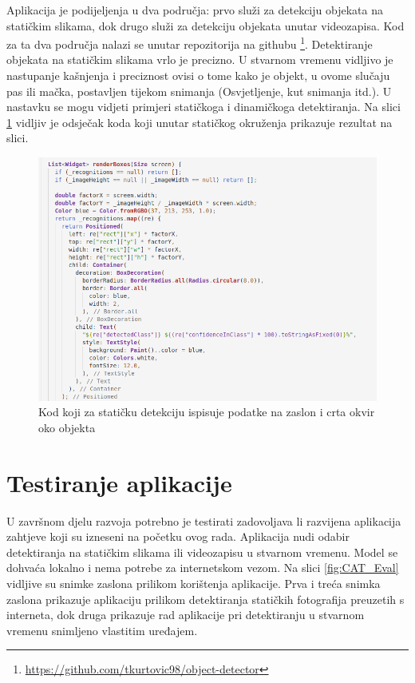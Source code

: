 Aplikacija je podijeljenja u dva područja: prvo služi za detekciju objekata na statičkim slikama, dok drugo služi za detekciju objekata unutar videozapisa. Kod za ta dva područja nalazi se unutar repozitorija na githubu \footnote{\url{https://github.com/tkurtovic98/object-detector}}.\newline
Detektiranje objekata na statičkim slikama vrlo je precizno. U stvarnom vremenu vidljivo je nastupanje kašnjenja i preciznost ovisi o tome 
kako je objekt, u ovome slučaju pas ili mačka, postavljen tijekom snimanja (Osvjetljenje, kut snimanja itd.). U nastavku se mogu vidjeti primjeri statičkoga i dinamičkoga detektiranja. Na slici \ref{Flutter-render-boxes} vidljiv je odsječak koda koji
unutar statičkog okruženja prikazuje rezultat na slici.

\begin{figure}[htb]
    \centering
    \includegraphics[width=14cm]{img/Flutter-render-boxes.png}
    \caption{Kod koji za statičku detekciju ispisuje podatke na zaslon i crta okvir oko objekta}
    \label{Flutter-render-boxes}
\end{figure}

\section{Testiranje aplikacije}
U završnom djelu razvoja potrebno je testirati zadovoljava li razvijena aplikacija zahtjeve koji su izneseni na početku ovog rada. Aplikacija nudi odabir 
detektiranja na statičkim slikama ili videozapisu u stvarnom vremenu. Model se dohvaća lokalno i nema potrebe za internetskom vezom.
Na slici \ref{fig:CAT_Eval} vidljive su snimke zaslona prilikom korištenja aplikacije. 
Prva i treća snimka zaslona prikazuje aplikaciju prilikom detektiranja statičkih fotografija preuzetih s interneta, dok druga prikazuje rad aplikacije pri detektiranju u stvarnom vremenu snimljeno vlastitim uređajem.


